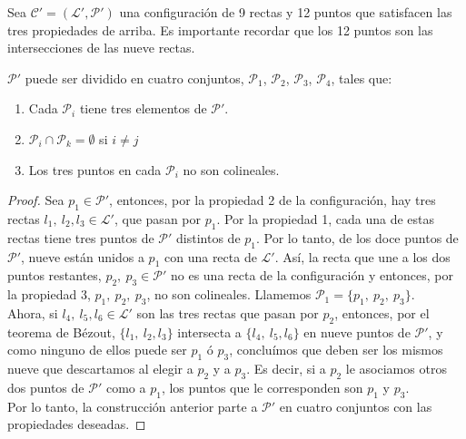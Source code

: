 Sea $\mathcal{C'=(L',P')}$ una configuración de 9 rectas y 12 puntos que satisfacen las tres propiedades de arriba. Es importante recordar que los 12 puntos son las intersecciones de las nueve rectas.

\begin{Lema}
\label{Lema:Conf}
$\mathcal{P'}$ puede ser dividido en cuatro conjuntos, $\mathcal{P}_{1}$, $\mathcal{P}_{2}$, $\mathcal{P}_{3}$, $\mathcal{P}_{4}$, tales que:

\begin{enumerate}

\item Cada $\mathcal{P}_{i}$ tiene tres elementos de $\mathcal{P'}$.
\item $\mathcal{P}_{i} \cap \mathcal{P}_{k} = \emptyset$ si $i \neq j$
\item Los tres puntos en cada $\mathcal{P}_{i}$ no son colineales.

\end{enumerate}

\end{Lema}

\begin{proof}

  Sea $p_{1} \in \mathcal{P'}$, entonces, por la propiedad 2 de la configuración, hay tres rectas $\mathit{l}_{1},\ \mathit{l}_{2}, \mathit{l}_{3} \in \mathcal{L'}$, que pasan por $p_{1}$. Por la propiedad 1, cada una de estas rectas tiene tres puntos de $\mathcal{P'}$ distintos de $p_{1}$. Por lo tanto, de los doce puntos de $\mathcal{P'}$, nueve están unidos a $p_{1}$ con una recta de $\mathcal{L'}$. Así, la recta que une a los dos puntos restantes, $p_{2},\ p_{3} \in \mathcal{P'}$ no es una recta de la configuración y entonces, por la propiedad 3, $p_{1},\ p_{2},\ p_{3}$, no son colineales. Llamemos $\mathcal{P}_{1} = \{p_{1},\ p_{2},\ p_{3} \}$.
\\

Ahora, si $\mathit{l}_{4},\ \mathit{l}_{5}, \mathit{l}_{6} \in \mathcal{L'}$ son las tres rectas que pasan por $p_{2}$, entonces, por el teorema de Bézout, $\{ \mathit{l}_{1},\ \mathit{l}_{2}, \mathit{l}_{3} \}$ intersecta a  $\{ \mathit{l}_{4},\ \mathit{l}_{5}, \mathit{l}_{6} \}$ en nueve puntos de $\mathcal{P'}$, y como ninguno de ellos puede ser $p_{1}$ ó $p_{3}$, concluímos que deben ser los mismos nueve que descartamos al elegir a $p_{2}$ y a $p_{3}$. Es decir, si a $p_{2}$ le asociamos otros dos puntos de $\mathcal{P'}$ como a $p_{1}$, los puntos que le corresponden son $p_{1}$ y $p_{3}$.
\\

Por lo tanto, la construcción anterior parte a $\mathcal{P'}$ en cuatro conjuntos con las propiedades deseadas.

\end{proof}


